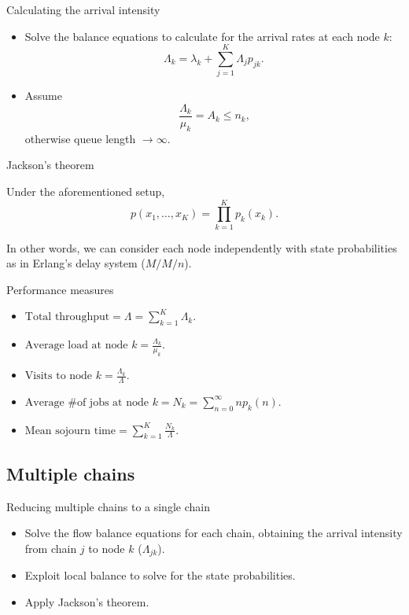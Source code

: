 \documentclass[serif, xcolor={svgnames, table}, usepdftitle=false]{beamer}
\begin{document}
\begin{frame}{Calculating the arrival intensity}
  \begin{itemize}
  \item Solve the balance equations to calculate for the arrival rates at each
    node $k$:
    \begin{equation}
      \Lambda_k = \lambda_k + \sum\limits_{j = 1}^{K} \Lambda_j p_{j k }\text{.}
    \end{equation}
  \item Assume
    \begin{equation*}
      \frac{\Lambda_k}{\mu_k} = A_k \le n_k\text{,}
    \end{equation*}
    otherwise queue length $\to \infty$.
  \end{itemize}
\end{frame}

\begin{frame}{Jackson's theorem}
  \begin{theorem}
    Under the aforementioned setup,
    $$
    p(x_1, \ldots, x_K) = \prod\limits_{k = 1}^{K} p_k(x_k)\text{.}
    $$
  \end{theorem}

  In other words, we can consider each node independently with state
  probabilities as in Erlang's delay system ($M/M/n$).
\end{frame}

\begin{frame}{Performance measures}
  \begin{itemize}
  \item
    $\displaystyle \text{Total throughput} = \Lambda = \sum\limits_{k = 1}^{K}
    \Lambda_k$.
  \item $\displaystyle \text{Average load at node }k = \frac{\Lambda_k}{\mu_k}$.
  \item $\displaystyle \text{Visits to node }k = \frac{\Lambda_k}{\Lambda}$.
  \item
    $\displaystyle \text{Average \# of jobs at node }k = N_k = \sum\limits_{n
      = 0}^{\infty} n p_k(n)$.
  \item
    $\displaystyle \text{Mean sojourn time} = \sum\limits_{k = 1}^{K}
    \frac{N_k}{\Lambda}$.
  \end{itemize}
\end{frame}

\subsection{Multiple chains}
\begin{frame}{Reducing multiple chains to a single chain}
  \begin{itemize}
  \item Solve the flow balance equations for each chain, obtaining the arrival
    intensity from chain $j$ to node $k$ ($\Lambda_{j k}$).
  \item Exploit local balance to solve for the state probabilities.
  \item Apply Jackson's theorem.
  \end{itemize}
\end{frame}
\end{document}
